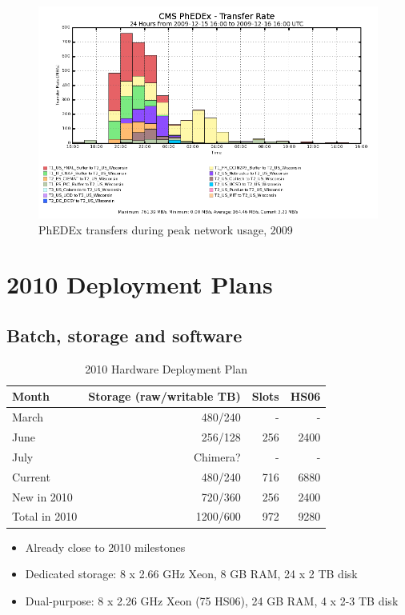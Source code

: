 \documentclass{beamer}
\begin{document}
\begin{frame}
\begin{figure}
	\includegraphics[width=\textwidth]{Graphics/phedex_prod_xfer_rates_Dec2009.png}
	\caption{PhEDEx transfers during peak network usage, 2009}
\end{figure}
\end{frame}

\section{2010 Deployment Plans}
\subsection{Batch, storage and software}
\begin{frame}
\begin{table}
\begin{tabular}{lrrr}
	\toprule
	Month					 	&	Storage (raw/writable TB)	&	Slots		& HS06 \\
	\midrule
	March					 	&	480/240										& - 			& - \\
	June						&	256/128										& 256			& 2400 \\
	July						&	Chimera?									&	-				&	- \\
	\midrule
	Current					& 480/240										& 716			& 6880 \\
	New in 2010			&	720/360										& 256 		& 2400 \\
	Total in 2010		&	1200/600									& 972 		& 9280 \\
	\bottomrule
\end{tabular}
\caption{2010 Hardware Deployment Plan}
\label{2010_hardware deployment_plan}
\end{table}

\begin{itemize}
	\item Already close to 2010 milestones
	\item Dedicated storage: 8 x 2.66 GHz Xeon, 8 GB RAM, 24 x 2 TB disk
	\item Dual-purpose: 8 x 2.26 GHz Xeon (75 HS06), 24 GB RAM, 4 x 2-3 TB disk
\end{itemize}

\end{frame}
\end{document}
